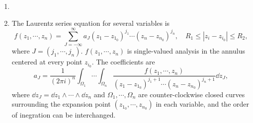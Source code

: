 \documentclass[lang=en,12pt]{beautybook}
\begin{document}
\begin{solution}
  \begin{enumerate}
    \item
    \item The Laurentz series equation for several variables is
          \[
            f(z_1,\cdots,z_n)=\sum_{J=-\infty}^{\infty} a_J (z_1-z_{1_0})^{j_1} \cdots (z_n-z_{n_0})^{j_n},\quad R_1\leqslant |z_i-z_{i_0}|\leqslant R_2,
          \]
          where $J=(j_1,\cdots,j_n)$.  $f(z_1,\cdots,z_n)$ is single-valued analysis in the annulus centered at every point $z_{i_0}$. The coefficients are
          \[
            a_J=\frac{1}{(2\pi i)^n} \int_{\Omega_1}\cdots \int_{\Omega_n} \frac{f(z_1,\cdots,z_n)}{(z_1-z_{1_0})^{j_1+1} \cdots (z_n-z_{n_0})^{j_n+1}}\dd z_J,
          \]
          where $\dd z_J=\dd z_1\wedge\cdots \wedge\dd z_n$ and $\Omega_1,\cdots,\Omega_n$ are counter-clockwise closed curves surrounding the expansion point $(z_{1_0},\cdots,z_{n_0})$ in each variable, and the order of inegration can be interchanged.


\end{enumerate}
\end{solution}
\end{document}
